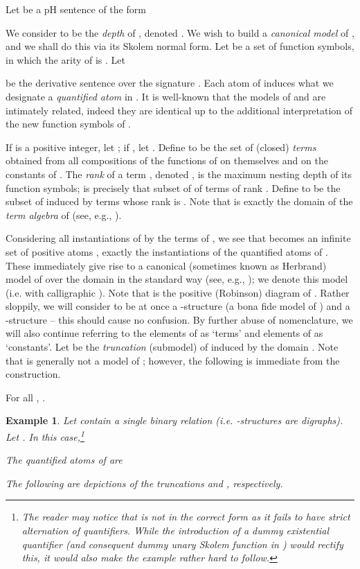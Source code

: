 \documentclass{LMCS}
\newtheorem{ex}{Example}
\begin{document}
Let  be a pH sentence of the form 

We consider  to be the \emph{depth} of , denoted . We wish to build a \emph{canonical model} of , and we shall do this via its Skolem normal form. Let  be a set of function symbols, in which the arity of  is . Let 

be the derivative sentence over the signature . Each atom of  induces what we designate a \emph{quantified atom} in . It is well-known that the models of  and  are intimately related, indeed they are identical up to the additional interpretation of the new function symbols of .

If  is a positive integer, let ; if , let . 
Define  to be the set of (closed) \emph{terms} obtained from all compositions of the functions of  on themselves and on the constants of . The \emph{rank} of a term , denoted , is the maximum nesting depth of its function symbols;  is precisely that subset of  of terms of rank . Define  to be the subset of  induced by terms whose rank is .
Note that  is exactly the domain of the \emph{term algebra} of  (see, e.g., \cite{Hodges}).

Considering all instantiations of  by the terms of , we see that  becomes an infinite set of positive atoms , exactly the instantiations of the quantified atoms of . These immediately give rise to a canonical (sometimes known as Herbrand) model of  over the domain   in the standard way (see, e.g., \cite{Hodges}); we denote this model  (\mbox{i.e.} with calligraphic ). Note that  is the positive (Robinson) diagram of . Rather sloppily, we will consider  to be at once a -structure (a bona fide model of ) and a -structure -- this should cause no confusion. By further abuse of nomenclature, we will also continue referring to the elements of  as `terms' and elements of  as `constants'. Let  be the \emph{truncation} (submodel) of  induced by the domain . Note that  is generally not a model of ; however, the following is immediate from the construction.
\begin{fact}
For all , .
\end{fact}
\begin{ex}
\label{ex:main}
Let  contain a single binary relation (i.e. -structures are digraphs).
Let . In this case,\footnote{The reader may notice that  is not in the correct form as it fails to have strict alternation of quantifiers. While the introduction of a dummy existential quantifier (and consequent dummy unary Skolem function in ) would rectify this, it would also make the example rather hard to follow.} 

The quantified atoms of  are 


\noindent The following are depictions of the truncations  and , respectively.





%
 \end{ex}
\end{document}
